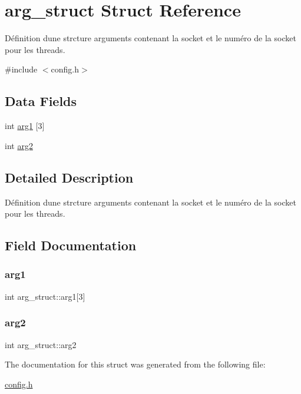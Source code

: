 \hypertarget{structarg__struct}{}\section{arg\+\_\+struct Struct Reference}
\label{structarg__struct}


Définition d\textquotesingle{}une strcture arguments contenant la socket et le numéro de la socket pour les threads.  




{\ttfamily \#include $<$config.\+h$>$}

\subsection*{Data Fields}
\begin{DoxyCompactItemize}
\item 
int \mbox{\hyperlink{structarg__struct_a5426e80ed610c1345d04f12fde446669}{arg1}} \mbox{[}3\mbox{]}
\item 
int \mbox{\hyperlink{structarg__struct_a36407e45b3298112d7931b9c7b2a1c83}{arg2}}
\end{DoxyCompactItemize}


\subsection{Detailed Description}
Définition d\textquotesingle{}une strcture arguments contenant la socket et le numéro de la socket pour les threads. 



\subsection{Field Documentation}
\mbox{\label{structarg__struct_a5426e80ed610c1345d04f12fde446669}} 
\subsubsection{\texorpdfstring{arg1}{arg1}}
{\footnotesize\ttfamily int arg\+\_\+struct\+::arg1\mbox{[}3\mbox{]}}

\mbox{\label{structarg__struct_a36407e45b3298112d7931b9c7b2a1c83}} 
\subsubsection{\texorpdfstring{arg2}{arg2}}
{\footnotesize\ttfamily int arg\+\_\+struct\+::arg2}



The documentation for this struct was generated from the following file\+:\begin{DoxyCompactItemize}
\item 
\mbox{\hyperlink{config_8h}{config.\+h}}\end{DoxyCompactItemize}
